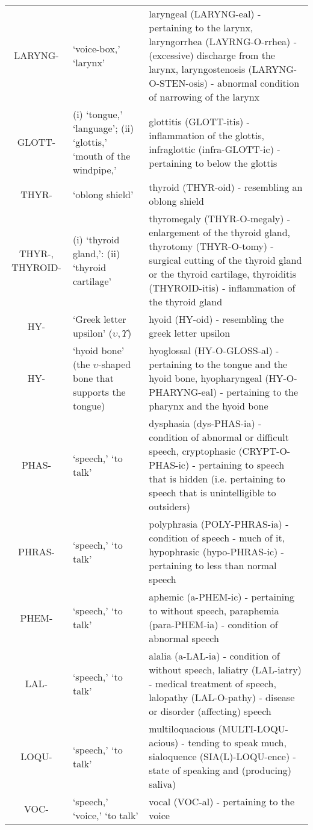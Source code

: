 \begin{longtable}{c | p{} | p{}}
        LARYNG- & `voice-box,' `larynx' & laryngeal (LARYNG-eal) - pertaining to the larynx, laryngorrhea (LAYRNG-O-rrhea) - (excessive) discharge from the larynx, laryngostenosis (LARYNG-O-STEN-osis) - abnormal condition of narrowing of the larynx \\
        GLOTT- & (i) `tongue,' `language'; (ii) `glottis,' `mouth of the windpipe,' & glottitis (GLOTT-itis) - inflammation of the glottis, infraglottic (infra-GLOTT-ic) - pertaining to below the glottis \\
        THYR- & `oblong shield' & thyroid (THYR-oid) - resembling an oblong shield \\
        THYR-, THYROID- & (i) `thyroid gland,': (ii) `thyroid cartilage' & thyromegaly (THYR-O-megaly) - enlargement of the thyroid gland, thyrotomy (THYR-O-tomy) - surgical cutting of the thyroid gland or the thyroid cartilage, thyroiditis (THYROID-itis) - inflammation of the thyroid gland \\
        HY- & `Greek letter upsilon' ($\upsilon, \Upsilon$) & hyoid (HY-oid) - resembling the greek letter upsilon \\
        HY- & `hyoid bone' (the $\upsilon$-shaped bone that supports the tongue) &  hyoglossal (HY-O-GLOSS-al) - pertaining to the tongue and the hyoid bone, hyopharyngeal (HY-O-PHARYNG-eal) - pertaining to the pharynx and the hyoid bone \\
        PHAS- & `speech,' `to talk' & dysphasia (dys-PHAS-ia) - condition of abnormal or difficult speech, cryptophasic (CRYPT-O-PHAS-ic) - pertaining to speech that is hidden (i.e. pertaining to speech that is unintelligible to outsiders) \\
        PHRAS- & `speech,' `to talk' & polyphrasia (POLY-PHRAS-ia) - condition of speech - much of it, hypophrasic (hypo-PHRAS-ic) - pertaining to less than normal speech \\
        PHEM- & `speech,' `to talk' & aphemic (a-PHEM-ic) - pertaining to without speech, paraphemia (para-PHEM-ia) - condition of abnormal speech \\
        LAL- & `speech,' `to talk' & alalia (a-LAL-ia) - condition of without speech, laliatry (LAL-iatry) - medical treatment of speech, lalopathy (LAL-O-pathy) - disease or disorder (affecting) speech \\
        LOQU- & `speech,' `to talk' & multiloquacious (MULTI-LOQU-acious) - tending to speak much, sialoquence (SIA(L)-LOQU-ence) - state of speaking and (producing) saliva) \\
        VOC- & `speech,' `voice,' `to talk' & vocal (VOC-al) - pertaining to the voice \\

\end{longtable}

